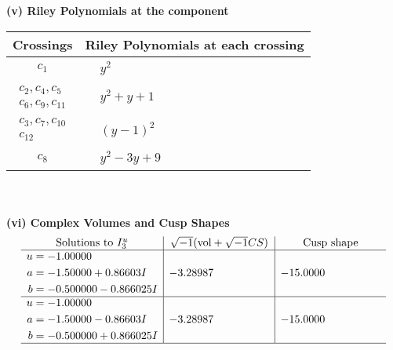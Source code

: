 \documentclass[1p]{elsarticle_modified}
\theoremstyle{definition}
\newcommand{\I}{\sqrt{-1}}
\begin{document}
\flushleft \textbf{(v) Riley Polynomials at the component}\newline \\
\begin{tabular}{m{50pt}|m{274pt}}
Crossings & \hspace{64pt}Riley Polynomials at each crossing \\
\hline $$\begin{aligned}c_{1}\end{aligned}$$&$\begin{aligned}
&y^2
\end{aligned}$\\
\hline $$\begin{aligned}c_{2},c_{4},c_{5}\\c_{6},c_{9},c_{11}\end{aligned}$$&$\begin{aligned}
&y^2+y+1
\end{aligned}$\\
\hline $$\begin{aligned}c_{3},c_{7},c_{10}\\c_{12}\end{aligned}$$&$\begin{aligned}
&(y-1)^2
\end{aligned}$\\
\hline $$\begin{aligned}c_{8}\end{aligned}$$&$\begin{aligned}
&y^2-3 y+9
\end{aligned}$\\
\hline
\end{tabular}\\~\\
\newpage\flushleft \textbf{(vi) Complex Volumes and Cusp Shapes}
$$\begin{array}{c|c|c}  
\text{Solutions to }I^u_{3}& \I (\text{vol} + \sqrt{-1}CS) & \text{Cusp shape}\\
 \hline 
\begin{aligned}
u &= -1.00000\phantom{ +0.000000I} \\
a &= -1.50000 + 0.86603 I \\
b &= -0.500000 - 0.866025 I\end{aligned}
 & -3.28987\phantom{ +0.000000I} & -15.0000\phantom{ +0.000000I} \\ \hline\begin{aligned}
u &= -1.00000\phantom{ +0.000000I} \\
a &= -1.50000 - 0.86603 I \\
b &= -0.500000 + 0.866025 I\end{aligned}
 & -3.28987\phantom{ +0.000000I} & -15.0000\phantom{ +0.000000I}\\
 \hline 
 \end{array}$$\newpage\newpage\renewcommand{\arraystretch}{1}
\end{document}
